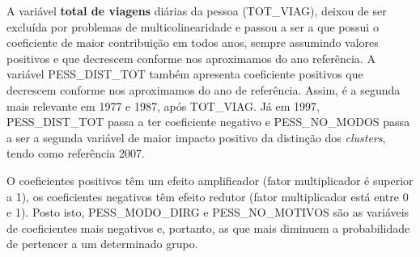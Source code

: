 A variável \textbf{total de viagens} diárias da pessoa (TOT_VIAG), deixou de ser excluída por problemas de multicolinearidade e passou a ser a que possui o coeficiente de maior contribuição em todos anos, sempre assumindo valores positivos e que decrescem conforme nos aproximamos do ano referência.
A variável PESS_DIST_TOT também apresenta coeficiente positivos que decrescem conforme nos aproximamos do ano de referência. Assim, é a segunda mais relevante em 1977 e 1987, após TOT_VIAG. Já em 1997, \mbox{PESS_DIST_TOT} passa a ter coeficiente negativo e PESS_NO_MODOS passa a ser a segunda variável de maior impacto positivo da distinção dos \textit{clusters}, tendo como referência 2007.

O coeficientes positivos têm um efeito amplificador (fator multiplicador é superior a 1), os coeficientes negativos têm efeito redutor (fator multiplicador está entre 0 e 1). 
Posto isto, PESS_MODO_DIRG e PESS_NO_MOTIVOS são as variáveis de coeficientes mais negativos e, portanto, as que mais diminuem a probabilidade de pertencer a um determinado grupo.

